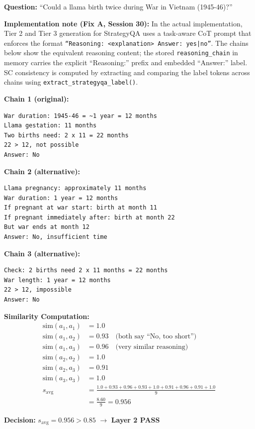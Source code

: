 \documentclass[12pt,a4paper]{article}
\theoremstyle{definition}
\begin{document}
\begin{examplebox}[title=Self-Consistency on StrategyQA]

\textbf{Question:} ``Could a llama birth twice during War in Vietnam (1945-46)?''

\textbf{Implementation note (Fix A, Session 30):} In the actual implementation, Tier 2 and Tier 3 generation for StrategyQA uses a task-aware CoT prompt that enforces the format \texttt{``Reasoning: <explanation> Answer: yes|no''}. The chains below show the equivalent reasoning content; the stored \texttt{reasoning\_chain} in memory carries the explicit ``Reasoning:'' prefix and embedded ``Answer:'' label. SC consistency is computed by extracting and comparing the label tokens across chains using \texttt{extract\_strategyqa\_label()}.

\textbf{Chain 1 (original):}
\begin{verbatim}
War duration: 1945-46 = ~1 year = 12 months
Llama gestation: 11 months
Two births need: 2 x 11 = 22 months
22 > 12, not possible
Answer: No
\end{verbatim}

\textbf{Chain 2 (alternative):}
\begin{verbatim}
Llama pregnancy: approximately 11 months
War duration: 1 year = 12 months
If pregnant at war start: birth at month 11
If pregnant immediately after: birth at month 22
But war ends at month 12
Answer: No, insufficient time
\end{verbatim}

\textbf{Chain 3 (alternative):}
\begin{verbatim}
Check: 2 births need 2 x 11 months = 22 months
War length: 1 year = 12 months
22 > 12, impossible
Answer: No
\end{verbatim}

\textbf{Similarity Computation:}
\begin{align}
\text{sim}(a_1, a_1) &= 1.0 \\
\text{sim}(a_1, a_2) &= 0.93 \quad \text{(both say ``No, too short'')} \\
\text{sim}(a_1, a_3) &= 0.96 \quad \text{(very similar reasoning)} \\
\text{sim}(a_2, a_2) &= 1.0 \\
\text{sim}(a_2, a_3) &= 0.91 \\
\text{sim}(a_3, a_3) &= 1.0 \\
s_{\text{avg}} &= \frac{1.0 + 0.93 + 0.96 + 0.93 + 1.0 + 0.91 + 0.96 + 0.91 + 1.0}{9} \\
&= \frac{8.60}{9} = 0.956
\end{align}

\textbf{Decision:} $s_{\text{avg}} = 0.956 > 0.85$ $\rightarrow$ \textbf{Layer 2 PASS}
\end{examplebox}
\end{document}
